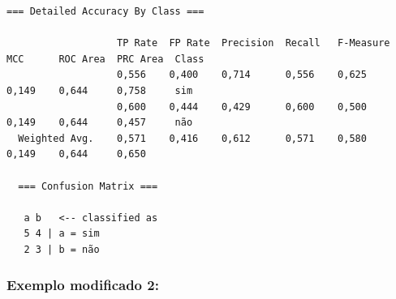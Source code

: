 \documentclass[
    article,            %
    11pt,               %
    oneside,            %
    a4paper,            %
    english,            %
    brazil,             %
    sumario=tradicional,
    ]{abntex2}
\begin{document}
\begin{itemize}
\begin{Verbatim}[frame=single, fontsize=\tiny]
  === Detailed Accuracy By Class ===

                   TP Rate  FP Rate  Precision  Recall   F-Measure  MCC      ROC Area  PRC Area  Class
                   0,556    0,400    0,714      0,556    0,625      0,149    0,644     0,758     sim
                   0,600    0,444    0,429      0,600    0,500      0,149    0,644     0,457     não
  Weighted Avg.    0,571    0,416    0,612      0,571    0,580      0,149    0,644     0,650     

  === Confusion Matrix ===

   a b   <-- classified as
   5 4 | a = sim
   2 3 | b = não
  \end{Verbatim}
\end{itemize}

\subsubsection{\textbf{Exemplo modificado 2:}}
\end{document}
